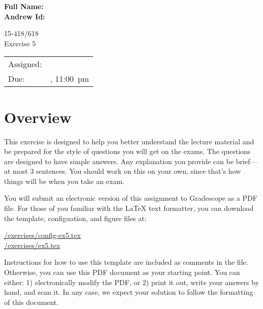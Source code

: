 \documentclass[11pt]{article}
\newcommand{\cref}[2]{\href{#1}{\color{blue}#2}}
\begin{document}
\begin{flushright}                         
{\large\bf Full Name: \makebox[2in][l]{    
                                           
                                           
}} \\[1ex]                                 
                                           
{\large\bf Andrew Id: \makebox[2in][l]{\tt 
                                           
}} \\[1ex]                                 
\end{flushright}                           
\vspace*{0.3in}                            
\begin{center}
\LARGE
15-418/618 \thisterm{} \\
Exercise 5
\end{center}

\begin{center}
\Large        
\begin{tabular}{ll}
\hline             
Assigned: & \dateassigned{}  \\
Due: &  \datedue{}, 11:00~pm  \\
\hline       
\end{tabular}
\end{center} 

\section*{Overview}

This exercise is designed to help you better understand the lecture
material and be prepared for the style of questions you will get on
the exams.  The questions are designed to have simple answers.  Any
explanation you provide can be brief---at most 3 sentences.  You
should work on this on your own, since that's how things will be when
you take an exam.

You will submit an electronic version of this assignment to Gradescope 
as a PDF file.  For those of you familiar with the \LaTeX{} text 
formatter, you can download the template, configuation, and figure files at: 
\begin{center} 
  \cref{\actualcoursehome/exercises/config-ex5.tex}{\visiblecoursehome/exercises/config-ex5.tex}\\ 
  \cref{\actualcoursehome/exercises/ex5.tex}{\visiblecoursehome/exercises/ex5.tex} \\
\end{center} 
Instructions for how to use this template are included as comments in 
the file.  Otherwise, you can use this PDF document as your starting 
point.  You can either: 1) electronically modify the PDF, or 2) print 
it out, write your answers by hand, and scan it.  In any case, we 
expect your solution to follow the formatting of this document. 
\end{document}
